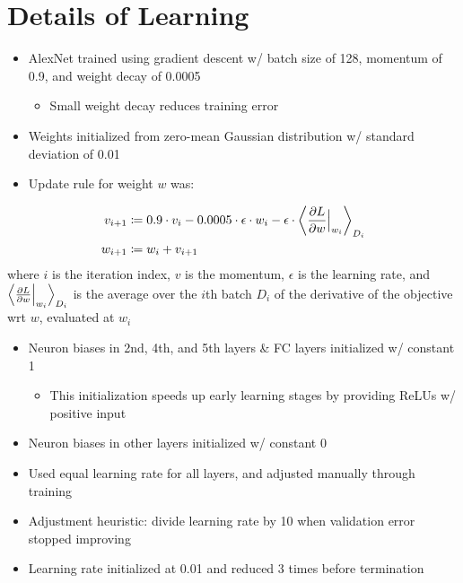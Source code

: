 \documentclass[a4paper,12pt]{article}
\begin{document}
\section{Details of Learning}
\begin{itemize}
  \item AlexNet trained using gradient descent w/ batch size of 128, momentum of 0.9, and weight decay of 0.0005
  \begin{itemize}
    \item Small weight decay reduces training error
  \end{itemize}
  \item Weights initialized from zero-mean Gaussian distribution w/ standard deviation of 0.01
  \item Update rule for weight $w$ was:
\end{itemize}
\begin{align}
  v_{i+1} &\coloneqq 0.9\cdot v_i - 0.0005\cdot\epsilon\cdot w_i - \epsilon\cdot \biggl\langle\frac{\partial L}{\partial w}\Bigl|_{w_i} \biggr\rangle_{D_i} \\
  w_{i+1} &\coloneqq w_i + v_{i+1}
\end{align}
where $i$ is the iteration index, $v$ is the momentum, $\epsilon$ is the learning rate, and $\Bigl\langle\frac{\partial L}{\partial w}\Bigl|_{w_i} \Bigr\rangle_{D_i}$ is the average over the $i$th batch $D_i$ of the derivative of the objective wrt $w$, evaluated at $w_i$
\begin{itemize}
  \item Neuron biases in 2nd, 4th, and 5th layers \& FC layers initialized w/ constant 1
  \begin{itemize}
    \item This initialization speeds up early learning stages by providing ReLUs w/ positive input
  \end{itemize}
  \item Neuron biases in other layers initialized w/ constant 0
  \item Used equal learning rate for all layers, and adjusted manually through training
  \item Adjustment heuristic: divide learning rate by 10 when validation error stopped improving
  \item Learning rate initialized at 0.01 and reduced 3 times before termination
\end{itemize}
\end{document}
